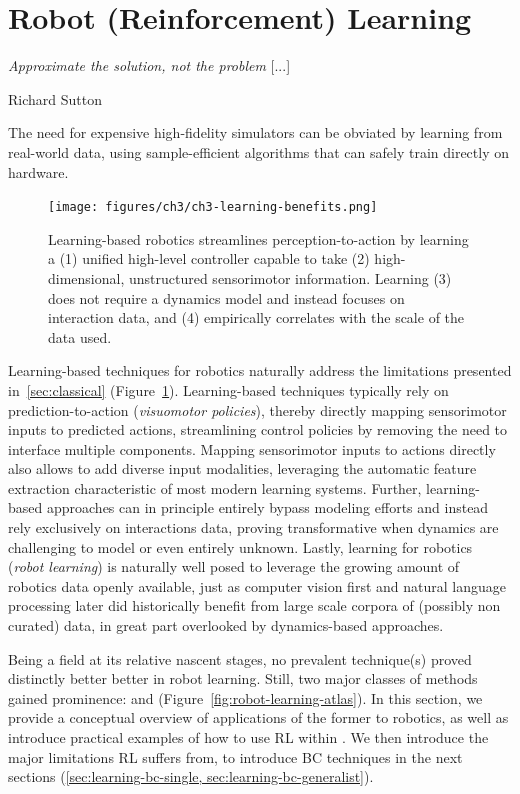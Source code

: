\section{Robot (Reinforcement) Learning}
\label{sec:learning-rl}

\epigraph{\textit{Approximate the solution, not the problem} [...]}{Richard Sutton}

\begin{tldr}
The need for expensive high-fidelity simulators can be obviated by learning from real-world data, using sample-efficient algorithms that can safely train directly on hardware.
\end{tldr}

\begin{figure}
    \centering
    \texttt{[image: figures/ch3/ch3-learning-benefits.png]}
    \caption{Learning-based robotics streamlines perception-to-action by learning a (1) unified high-level controller capable to take (2) high-dimensional, unstructured sensorimotor information. Learning (3) does not require a dynamics model and instead focuses on interaction data, and (4) empirically correlates with
    the scale of the data used.
    }
    \label{fig:robot-learning-upsides}
\end{figure}

Learning-based techniques for robotics naturally address the limitations presented in~\ref{sec:classical} (Figure~\ref{fig:robot-learning-upsides}).
Learning-based techniques typically rely on prediction-to-action (\emph{visuomotor policies}), thereby directly mapping sensorimotor inputs to predicted actions, streamlining control policies by removing the need to interface multiple components.
Mapping sensorimotor inputs to actions directly also allows to add diverse input modalities, leveraging the automatic feature extraction characteristic of most modern learning systems.
Further, learning-based approaches can in principle entirely bypass modeling efforts and instead rely exclusively on interactions data, proving transformative when dynamics are challenging to model or even entirely unknown.
Lastly, learning for robotics (\emph{robot learning}) is naturally well posed to leverage the growing amount of robotics data openly available, just as computer vision first and natural language processing later did historically benefit from large scale corpora of (possibly non curated) data, in great part overlooked by dynamics-based approaches.

Being a field at its relative nascent stages, no prevalent technique(s) proved distinctly better better in robot learning.
Still, two major classes of methods gained prominence:  and  (Figure~\ref{fig:robot-learning-atlas}).
In this section, we provide a conceptual overview of applications of the former to robotics, as well as introduce practical examples of how to use RL within \lerobot.
We then introduce the major limitations RL suffers from, to introduce BC techniques in the next sections (\ref{sec:learning-bc-single, sec:learning-bc-generalist}).

